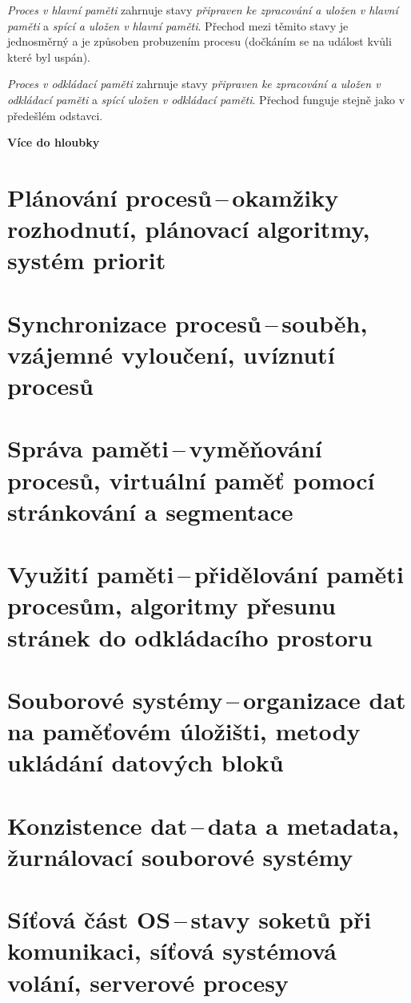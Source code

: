 \textit{Proces v hlavní paměti} zahrnuje stavy \textit{připraven ke zpracování a uložen v hlavní paměti} a \textit{spící a uložen v hlavní paměti}. Přechod mezi těmito stavy je jednosměrný a je způsoben probuzením procesu (dočkáním se na událost kvůli které byl uspán).

\vspace{0,5cm}

\textit{Proces v odkládací paměti} zahrnuje stavy \textit{připraven ke zpracování a uložen v odkládací paměti} a \textit{spící uložen v odkládací paměti}. Přechod funguje stejně jako v předešlém odstavci. 

\begin{Large}
    \vspace{0,5cm}    
    \textbf{Více do hloubky}
\end{Large}


\newpage
\section{Plánování procesů\,--\,okamžiky rozhodnutí, plánovací algoritmy, systém priorit}

\newpage
\section{Synchronizace procesů\,--\,souběh, vzájemné vyloučení, uvíznutí procesů} \label{sync}

\newpage
\section{Správa paměti\,--\,vyměňování procesů, virtuální paměť pomocí stránkování a segmentace}

\newpage
\section{Využití paměti\,--\,přidělování paměti procesům, algoritmy přesunu stránek do odkládacího prostoru}

\newpage
\section{Souborové systémy\,--\,organizace dat na paměťovém úložišti, metody ukládání datových bloků}

\newpage
\section{Konzistence dat\,--\,data a metadata, žurnálovací souborové systémy}

\newpage
\section{Síťová část OS\,--\,stavy soketů při komunikaci, síťová systémová volání, serverové procesy}